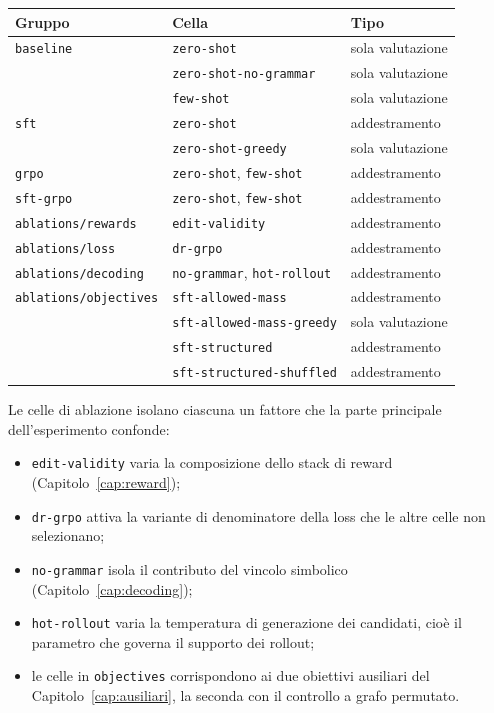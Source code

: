 \begin{center}
\begin{tabular}{lll}
\toprule
Gruppo & Cella & Tipo \\
\midrule
\texttt{baseline} & \texttt{zero-shot} & sola valutazione \\
                  & \texttt{zero-shot-no-grammar} & sola valutazione \\
                  & \texttt{few-shot} & sola valutazione \\
\midrule
\texttt{sft} & \texttt{zero-shot} & addestramento \\
             & \texttt{zero-shot-greedy} & sola valutazione \\
\midrule
\texttt{grpo} & \texttt{zero-shot}, \texttt{few-shot} & addestramento \\
\midrule
\texttt{sft-grpo} & \texttt{zero-shot}, \texttt{few-shot} & addestramento \\
\midrule
\texttt{ablations/rewards} & \texttt{edit-validity} & addestramento \\
\texttt{ablations/loss} & \texttt{dr-grpo} & addestramento \\
\texttt{ablations/decoding} & \texttt{no-grammar}, \texttt{hot-rollout} & addestramento \\
\texttt{ablations/objectives} & \texttt{sft-allowed-mass} & addestramento \\
                              & \texttt{sft-allowed-mass-greedy} & sola valutazione \\
                              & \texttt{sft-structured} & addestramento \\
                              & \texttt{sft-structured-shuffled} & addestramento \\
\bottomrule
\end{tabular}
\end{center}

Le celle di ablazione isolano ciascuna un fattore che la parte principale
dell'esperimento confonde:
\begin{itemize}
  \item \texttt{edit-validity} varia la composizione dello stack di reward
        (Capitolo~\ref{cap:reward});
  \item \texttt{dr-grpo} attiva la variante di denominatore della loss che le
        altre celle non selezionano;
  \item \texttt{no-grammar} isola il contributo del vincolo simbolico
        (Capitolo~\ref{cap:decoding});
  \item \texttt{hot-rollout} varia la temperatura di generazione dei candidati,
        cioè il parametro che governa il supporto dei rollout;
  \item le celle in \texttt{objectives} corrispondono ai due obiettivi
        ausiliari del Capitolo~\ref{cap:ausiliari}, la seconda con il controllo a
        grafo permutato.
\end{itemize}

